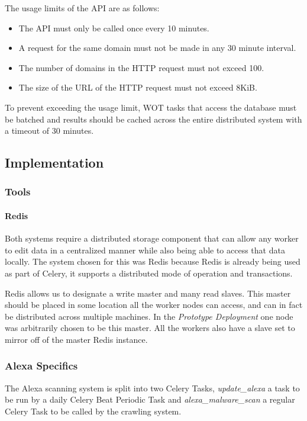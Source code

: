 The usage limits of the API are as follows\cite{wot-about}:

\begin{itemize}
    \item The API must only be called once every 10 minutes.
    \item A request for the same domain must not be made in any 30 minute interval.
    \item The number of domains in the HTTP request must not exceed 100.
    \item The size of the URL of the HTTP request must not exceed 8KiB.
\end{itemize}

To prevent exceeding the usage limit, WOT tasks that access the database must be batched and results should be cached across the entire distributed system with a timeout of 30 minutes.


\subsection{Implementation}
\subsubsection{Tools}
\paragraph{Redis}
Both systems require a distributed storage component that can allow any worker to edit data in a centralized manner while also being able to access that data locally. The system chosen for this was Redis\cite{redis} because Redis is already being used as part of Celery, it supports a distributed mode of operation and transactions.

Redis allows us to designate a write master and many read slaves. This master should be placed in some location all the worker nodes can access, and can in fact be distributed across multiple machines.  In the \emph{Prototype Deployment} one node was arbitrarily chosen to be this master. All the workers also have a slave set to mirror off of the master Redis instance.

\subsubsection{Alexa Specifics}
The Alexa scanning system is split into two Celery Tasks, \emph{update\_alexa} a task to be run by a daily Celery Beat Periodic Task and \emph{alexa\_malware\_scan} a regular Celery Task to be called by the crawling system.

